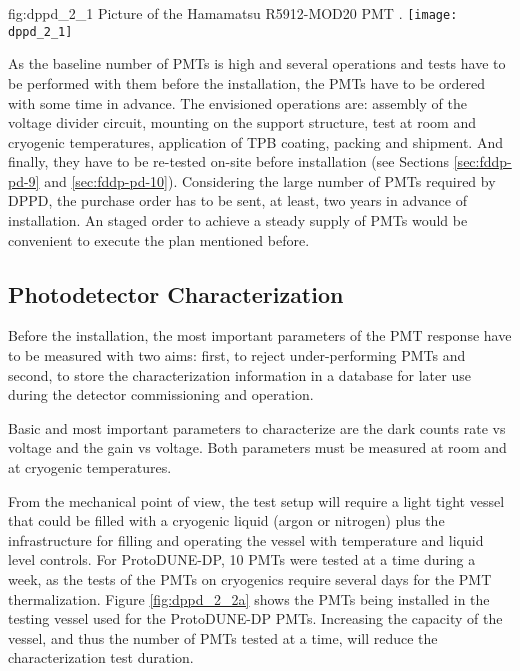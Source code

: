 \begin{dunefigure}{fig:dppd_2_1}
{Picture of the Hamamatsu R5912-MOD20 PMT \cite{hamamatsu-5912}.}
\texttt{[image: dppd\_2\_1]}
\end{dunefigure}

As the baseline number of PMTs is high and several operations and tests have to be performed with them before the installation, the PMTs have to be ordered with some time in advance. The envisioned operations are: assembly of the voltage divider circuit, mounting on the support structure, test at room and cryogenic temperatures, application of TPB coating, packing and shipment. And finally, they have to be re-tested on-site before installation (see Sections \ref{sec:fddp-pd-9} and \ref{sec:fddp-pd-10}). Considering the large number of PMTs required by DPPD, the purchase order has to be sent, at least, two years in advance of installation. An staged order to achieve a steady supply of PMTs would be convenient to execute the plan mentioned before. 

\subsection{Photodetector Characterization}
\label{sec:fddp-pd-2.2}

Before the installation, the most important parameters of the PMT response have to be measured with two aims: first, to reject under-performing PMTs and second, to store the characterization information in a database for later use during the detector commissioning and operation.

Basic and most important parameters to characterize are the dark counts rate vs voltage and the gain vs voltage. Both parameters must be measured at room and at cryogenic temperatures.

From the mechanical point of view, the test setup will require a light tight vessel that could be filled with a cryogenic liquid (argon or nitrogen) plus the infrastructure for filling and operating the vessel with temperature and liquid level controls. For ProtoDUNE-DP, \num{10} PMTs were tested at a time during a week, as the tests of the PMTs on cryogenics require several days for the PMT thermalization. Figure \ref{fig:dppd_2_2a} shows the PMTs being installed in the testing vessel used for the ProtoDUNE-DP PMTs. Increasing the capacity of the vessel, and thus the number of PMTs tested at a time, will reduce the characterization test duration.

